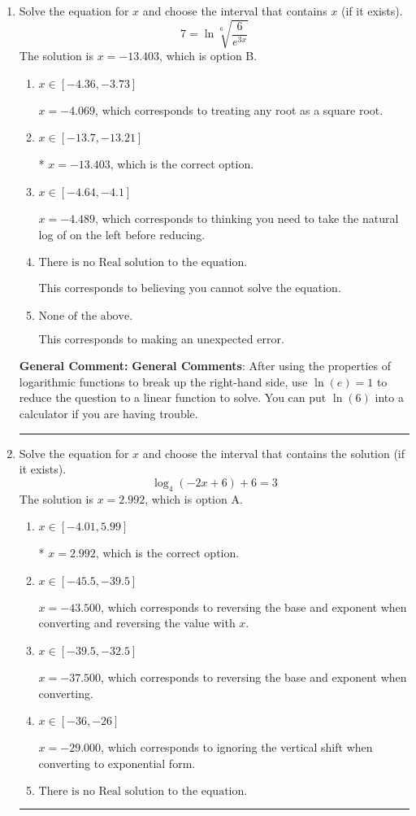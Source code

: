 \documentclass{extbook}[14pt]
\newcommand{\litem}[1]{\item #1

\rule{\textwidth}{0.4pt}}
\begin{document}
\begin{enumerate}\litem{
 Solve the equation for $x$ and choose the interval that contains $x$ (if it exists).
\[  7 = \ln{\sqrt[6]{\frac{6}{e^{3x}}}} \]
The solution is \( x = -13.403 \), which is option B.\begin{enumerate}[label=\Alph*.]
\item \( x \in [-4.36, -3.73] \)

$x = -4.069$, which corresponds to treating any root as a square root.
\item \( x \in [-13.7, -13.21] \)

* $x = -13.403$, which is the correct option.
\item \( x \in [-4.64, -4.1] \)

$x = -4.489$, which corresponds to thinking you need to take the natural log of on the left before reducing.
\item \( \text{There is no Real solution to the equation.} \)

This corresponds to believing you cannot solve the equation.
\item \( \text{None of the above.} \)

This corresponds to making an unexpected error.
\end{enumerate}

\textbf{General Comment:} \textbf{General Comments}: After using the properties of logarithmic functions to break up the right-hand side, use $\ln(e) = 1$ to reduce the question to a linear function to solve. You can put $\ln(6)$ into a calculator if you are having trouble.
}
\litem{
Solve the equation for $x$ and choose the interval that contains the solution (if it exists).
\[ \log_{4}{(-2x+6)}+6 = 3 \]
The solution is \( x = 2.992 \), which is option A.\begin{enumerate}[label=\Alph*.]
\item \( x \in [-4.01, 5.99] \)

* $x = 2.992$, which is the correct option.
\item \( x \in [-45.5, -39.5] \)

$x = -43.500$, which corresponds to reversing the base and exponent when converting and reversing the value with $x$.
\item \( x \in [-39.5, -32.5] \)

$x = -37.500$, which corresponds to reversing the base and exponent when converting.
\item \( x \in [-36, -26] \)

$x = -29.000$, which corresponds to ignoring the vertical shift when converting to exponential form.
\item \( \text{There is no Real solution to the equation.} \)


\end{enumerate}}
\end{enumerate}
\end{document}
